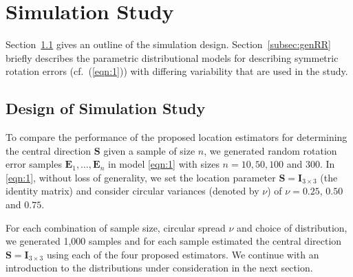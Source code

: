\section{Simulation Study}\label{ch:simulation}

Section~\ref{subsec:simdesign} gives an outline of the simulation design.  Section~\ref{subsec:genRR} briefly describes the parametric distributional models for describing symmetric rotation errors (cf.~(\ref{eqn:1})) with differing variability that are used in the study. 



\subsection{Design of Simulation Study}
\label{subsec:simdesign}
To compare the performance of the proposed location estimators for determining the central direction $\bm{S}$ given a sample of size $n$, we generated random rotation error samples  $\bm E_1, \ldots, \bm E_n$  in model \eqref{eqn:1} with sizes $n=10, 50, 100$ and 300. In \eqref{eqn:1}, without loss of generality, we set the location parameter $\bm S=\bm I_{3\times 3}$ (the identity matrix) and consider circular variances (denoted  by $\nu$) of $\nu=0.25$, $0.50$ and $0.75$. 

For each combination of sample size, circular spread $\nu$ and choice of distribution, we generated 1,000 samples and for each sample estimated the central direction  $\bm S=\bm I_{3\times 3}$ using each of the four proposed estimators.  We continue with an introduction to the distributions under consideration in the next section.


